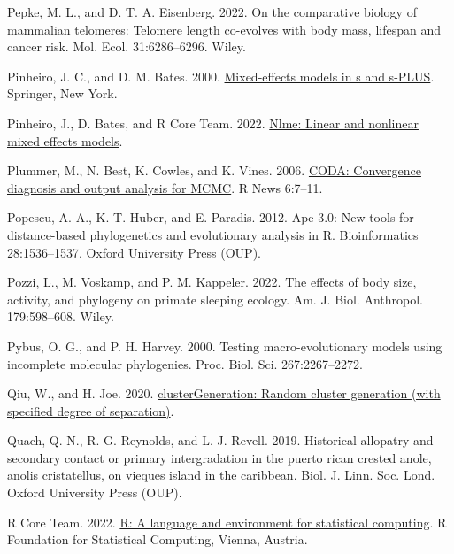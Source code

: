 \documentclass[fleqn,10pt,lineno]{wlpeerj} %
\newlength{\cslhangindent}
\newlength{\cslentryspacingunit} %
\newenvironment{CSLReferences}[2] %
 {%
  \setlength{\parindent}{0pt}
  \ifodd #1
  \let\oldpar\par
  \def\par{\hangindent=\cslhangindent\oldpar}
  \fi
  \setlength{\parskip}{#2\cslentryspacingunit}
 }%
 {}
\begin{document}
\begin{CSLReferences}{1}{0}
\leavevmode{}%
Pepke, M. L., and D. T. A. Eisenberg. 2022. On the comparative biology of mammalian telomeres: Telomere length co-evolves with body mass, lifespan and cancer risk. Mol. Ecol. 31:6286--6296. Wiley.

\leavevmode{}%
Pinheiro, J. C., and D. M. Bates. 2000. \href{https://doi.org/10.1007/b98882}{Mixed-effects models in s and s-PLUS}. Springer, New York.

\leavevmode{}%
Pinheiro, J., D. Bates, and R Core Team. 2022. \href{https://CRAN.R-project.org/package=nlme}{Nlme: Linear and nonlinear mixed effects models}.

\leavevmode{}%
Plummer, M., N. Best, K. Cowles, and K. Vines. 2006. \href{https://journal.r-project.org/archive/}{CODA: Convergence diagnosis and output analysis for MCMC}. R News 6:7--11.

\leavevmode{}%
Popescu, A.-A., K. T. Huber, and E. Paradis. 2012. Ape 3.0: New tools for distance-based phylogenetics and evolutionary analysis in {R}. Bioinformatics 28:1536--1537. Oxford University Press (OUP).

\leavevmode{}%
Pozzi, L., M. Voskamp, and P. M. Kappeler. 2022. The effects of body size, activity, and phylogeny on primate sleeping ecology. Am. J. Biol. Anthropol. 179:598--608. Wiley.

\leavevmode{}%
Pybus, O. G., and P. H. Harvey. 2000. Testing macro-evolutionary models using incomplete molecular phylogenies. Proc. Biol. Sci. 267:2267--2272.

\leavevmode{}%
Qiu, W., and H. Joe. 2020. \href{https://CRAN.R-project.org/package=clusterGeneration}{clusterGeneration: Random cluster generation (with specified degree of separation)}.

\leavevmode{}%
Quach, Q. N., R. G. Reynolds, and L. J. Revell. 2019. Historical allopatry and secondary contact or primary intergradation in the puerto rican crested anole, anolis cristatellus, on vieques island in the caribbean. Biol. J. Linn. Soc. Lond. Oxford University Press (OUP).

\leavevmode{}%
R Core Team. 2022. \href{https://www.R-project.org/}{R: A language and environment for statistical computing}. R Foundation for Statistical Computing, Vienna, Austria.


\end{CSLReferences}
\end{document}
